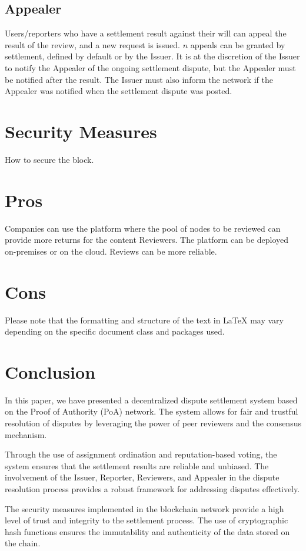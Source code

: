 \documentclass{article}
\begin{document}
\subsection{Appealer}
Users/reporters who have a settlement result against their will can appeal the result of the review, and a new request is issued. \(n\) appeals can be granted by settlement, defined by default or by the Issuer. It is at the discretion of the Issuer to notify the Appealer of the ongoing settlement dispute, but the Appealer must be notified after the result. The Issuer must also inform the network if the Appealer was notified when the settlement dispute was posted.

\section{Security Measures}
How to secure the block.

\section{Pros}
Companies can use the platform where the pool of nodes to be reviewed can provide more returns for the content Reviewers. The platform can be deployed on-premises or on the cloud. Reviews can be more reliable.

\section{Cons }

Please note that the formatting and structure of the text in LaTeX may vary depending on the specific document class and packages used.

\section{Conclusion}
In this paper, we have presented a decentralized dispute settlement system based on the Proof of Authority (PoA) network. The system allows for fair and trustful resolution of disputes by leveraging the power of peer reviewers and the consensus mechanism.

Through the use of assignment ordination and reputation-based voting, the system ensures that the settlement results are reliable and unbiased. The involvement of the Issuer, Reporter, Reviewers, and Appealer in the dispute resolution process provides a robust framework for addressing disputes effectively.

The security measures implemented in the blockchain network provide a high level of trust and integrity to the settlement process. The use of cryptographic hash functions ensures the immutability and authenticity of the data stored on the chain.
\end{document}
